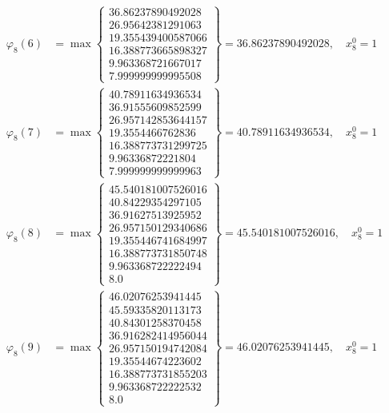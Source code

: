 \documentclass{article}
\begin{document}
\begin{align*}
  
\varphi_{8}(6) &= \max \left\{ \begin{array}{c}
36.86237890492028 \\
 26.95642381291063 \\
 19.355439400587066 \\
 16.388773665898327 \\
 9.963368721667017 \\
 7.999999999995508
\end{array} \right\} = 36.86237890492028, \quad x_{8}^0 = 1\\
  
  
  
  
\varphi_{8}(7) &= \max \left\{ \begin{array}{c}
40.78911634936534 \\
 36.91555609852599 \\
 26.957142853644157 \\
 19.3554466762836 \\
 16.388773731299725 \\
 9.96336872221804 \\
 7.999999999999963
\end{array} \right\} = 40.78911634936534, \quad x_{8}^0 = 1\\
  
  
  
  
\varphi_{8}(8) &= \max \left\{ \begin{array}{c}
45.540181007526016 \\
 40.84229354297105 \\
 36.91627513925952 \\
 26.957150129340686 \\
 19.355446741684997 \\
 16.388773731850748 \\
 9.963368722222494 \\
 8.0
\end{array} \right\} = 45.540181007526016, \quad x_{8}^0 = 1\\
  
  
  
  
\varphi_{8}(9) &= \max \left\{ \begin{array}{c}
46.02076253941445 \\
 45.59335820113173 \\
 40.84301258370458 \\
 36.916282414956044 \\
 26.957150194742084 \\
 19.35544674223602 \\
 16.388773731855203 \\
 9.963368722222532 \\
 8.0
\end{array} \right\} = 46.02076253941445, \quad x_{8}^0 = 1\\
  

\end{align*}
\end{document}
